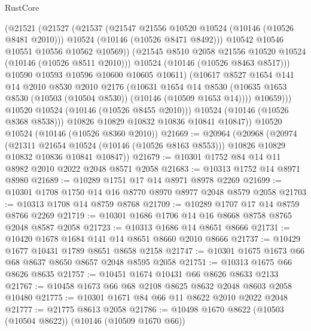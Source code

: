 \begin{lexlean}{RustCore}
\begin{coremodule}
                    (@21521
                      (@21527
                        (@21537
                          (@21547 @21556 @10520 @10524 (@10146 (@10526 @8481 @2010)))
                          @10524
                          (@10146 (@10526 @8471 @8492)))
                        @10542
                        @10546
                        @10551
                        @10556
                        @10562
                        @10569))
                    (@21545 @8510 @2058 @21556 @10520 @10524 (@10146 (@10526 @8511 @2010)))
                    @10524
                    (@10146 (@10526 @8463 @8517)))
                  @10590
                  @10593
                  @10596
                  @10600
                  @10605
                  @10611)
                (@10617
                  @8527
                  @1654
                  @141
                  @14
                  @2010
                  @8530
                  @2010
                  @2176
                  (@10631
                    @1654
                    @14
                    @8530
                    (@10635 @1653 @8530 (@10503 (@10504 @8530)) (@10146 (@10509 @1653 @14))))
                  @10659)))
            @10520
            @10524
            (@10146 (@10526 @8455 @2010)))
          @10524
          (@10146 (@10526 @8368 @8538)))
        @10826
        @10829
        @10832
        @10836
        @10841
        @10847))
    @10520
    @10524
    (@10146 (@10526 @8360 @2010))
@21669 := @20964
    (@20968
      (@20974
        (@21311 @21654 @10524 (@10146 (@10526 @8163 @8553)))
        @10826
        @10829
        @10832
        @10836
        @10841
        @10847))
@21679 := @10301 @1752 @84 @14 @11 @8982 @2010 @2022 @2048 @8571 @2058
@21683 := @10313 @1752 @14 @8971 @8980
@21689 := @10289 @1751 @17 @14 @8971 @8978 @2269
@21699 := @10301 @1708 @1750 @14 @16 @8770 @8970 @8977 @2048 @8579 @2058
@21703 := @10313 @1708 @14 @8759 @8768
@21709 := @10289 @1707 @17 @14 @8759 @8766 @2269
@21719 := @10301 @1686 @1706 @14 @16 @8668 @8758 @8765 @2048 @8587 @2058
@21723 := @10313 @1686 @14 @8651 @8666
@21731 := @10420 @1678 @1684 @141 @14 @8651 @8660 @2010 @8666
@21737 := @10429 @1677 @10431 @1789 @8651 @8658 @2158
@21747 := @10301 @1675 @1673 @66 @68 @8637 @8650 @8657 @2048 @8595 @2058
@21751 := @10313 @1675 @66 @8626 @8635
@21757 := @10451 @1674 @10431 @66 @8626 @8633 @2133
@21767 := @10458 @1673 @66 @68 @2108 @8625 @8632 @2048 @8603 @2058 @10480
@21775 := @10301 @1671 @84 @66 @11 @8622 @2010 @2022 @2048
@21777 := @21775 @8613 @2058
@21786 := @10498 @1670 @8622 (@10503 (@10504 @8622)) (@10146 (@10509 @1670 @66))

\end{coremodule}
\end{lexlean}
